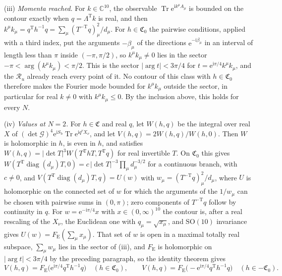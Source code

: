 (iii) \emph{Momenta reached.} For \(k\in\mathbb C^{10}\), the observable \(\operatorname{Tr}\mathrm e^{\mathrm ik^\mu A_\mu}\) is bounded on the contour exactly when \(q=\Lambda^{\mathrm T}k\) is real, and then \(k^\mu k_\mu=q^{\mathrm T}h^{-1}q=\sum_\mu(T^{-\mathrm T}q)_\mu^2/d_\mu\). For \(h\in\mathfrak C_0\) the pairwise conditions, applied with a third index, put the arguments \(-\beta_\mu\) of the directions \(\mathrm e^{-\mathrm i\beta_\mu}\) in an interval of length less than \(\pi\) inside \((-\pi,\pi/2)\), so \(k^\mu k_\mu\neq0\) lies in the sector \(-\pi<\arg(k^\mu k_\mu)<\pi/2\). This is the sector \(|\arg t|<3\pi/4\) for \(t=\mathrm e^{\mathrm i\pi/4}k^\mu k_\mu\), and the \(\mathcal R_u\) already reach every point of it. No contour of this class with \(h\in\mathfrak C_0\) therefore makes the Fourier mode bounded for \(k^\mu k_\mu\) outside the sector, in particular for real \(k\neq0\) with \(k^\mu k_\mu\le0\). By the inclusion above, this holds for every \(N\).

(iv) \emph{Values at \(N=2\).} For \(h\in\mathfrak C\) and real \(q\), let \(W(h,q)\) be the integral over real \(X\) of \((\det\mathcal G)^4\mathrm e^{\mathrm iS_{\mathrm b}}\operatorname{Tr}\mathrm e^{\mathrm iq^\nu X_\nu}\), and let \(V(h,q)=2W(h,q)/W(h,0)\). Then \(W\) is holomorphic in \(h\), is even in \(h\), and satisfies \(W(h,q)=|\det T|^3W(T^{\mathrm T}hT,T^{\mathrm T}q)\) for real invertible \(T\). On \(\mathfrak C_0\) this gives \(W(T^{\mathrm T}\operatorname{diag}(d_\mu)T,0)=c\,|\det T|^{-3}\prod_\mu d_\mu^{-3/2}\) for a continuous branch, with \(c\neq0\), and \(V(T^{\mathrm T}\operatorname{diag}(d_\mu)T,q)=U(w)\) with \(w_\mu=(T^{-\mathrm T}q)_\mu^2/d_\mu\), where \(U\) is holomorphic on the connected set of \(w\) for which the arguments of the \(1/w_\mu\) can be chosen with pairwise sums in \((0,\pi)\); zero components of \(T^{-\mathrm T}q\) follow by continuity in \(q\). For \(w=\mathrm e^{-\mathrm i\pi/4}x\) with \(x\in(0,\infty)^{10}\) the contour is, after a real rescaling of the \(X_\nu\), the Euclidean one with \(q_\mu=\sqrt{x_\mu}\), and \(\mathrm{SO}(10)\) invariance gives \(U(w)=F_{\mathrm E}(\sum_\mu x_\mu)\). That set of \(w\) is open in a maximal totally real subspace, \(\sum_\mu w_\mu\) lies in the sector of (iii), and \(F_{\mathrm E}\) is holomorphic on \(|\arg t|<3\pi/4\) by the preceding paragraph, so the identity theorem gives
\[
V(h,q)=F_{\mathrm E}\bigl(\mathrm e^{\mathrm i\pi/4}q^{\mathrm T}h^{-1}q\bigr)\quad(h\in\mathfrak C_0),\qquad V(h,q)=F_{\mathrm E}\bigl(-\mathrm e^{\mathrm i\pi/4}q^{\mathrm T}h^{-1}q\bigr)\quad(h\in-\mathfrak C_0).
\]

